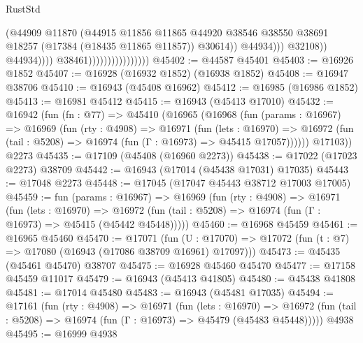 \begin{lexlean}{RustStd}
\begin{coremodule}
                                                      (@44909
                                                        @11870
                                                        (@44915
                                                          @11856
                                                          @11865
                                                          @44920
                                                          @38546
                                                          @38550
                                                          @38691
                                                          @18257
                                                          (@17384 (@18435 @11865 @11857))
                                                          @30614))
                                                      @44934)))
                                                @32108))
                                            @44934))))
                                    @38461))))))))))))))))
@45402 := @44587 @45401
@45403 := @16926 @1852
@45407 := @16928 (@16932 @1852) (@16938 @1852)
@45408 := @16947 @38706
@45410 := @16943 (@45408 @16962)
@45412 := @16985 (@16986 @1852)
@45413 := @16981 @45412
@45415 := @16943 (@45413 @17010)
@45432 := @16942
    (fun (fn : @77) =>
    @45410
      (@16965
        (@16968
          (fun (params : @16967) =>
          @16969
            (fun (rty : @4908) =>
            @16971
              (fun (lets : @16970) =>
              @16972 (fun (tail : @5208) => @16974 (fun (Γ : @16973) => @45415 @17057))))))
        @17103))
    @2273
@45435 := @17109 (@45408 (@16960 @2273))
@45438 := @17022 (@17023 @2273) @38709
@45442 := @16943 (@17014 (@45438 @17031) @17035)
@45443 := @17048 @2273
@45448 := @17045 (@17047 @45443 @38712 @17003 @17005)
@45459 := fun (params : @16967) =>
  @16969
    (fun (rty : @4908) =>
    @16971
      (fun (lets : @16970) =>
      @16972 (fun (tail : @5208) => @16974 (fun (Γ : @16973) => @45415 (@45442 @45448)))))
@45460 := @16968 @45459
@45461 := @16965 @45460
@45470 := @17071
    (fun (U : @17070) => @17072 (fun (t : @7) => @17080 (@16943 (@17086 @38709 @16961) @17097)))
@45473 := @45435 (@45461 @45470) @38707
@45475 := @16928 @45460 @45470
@45477 := @17158 @45459 @11017
@45479 := @16943 (@45413 @41805)
@45480 := @45438 @41808
@45481 := @17014 @45480
@45483 := @16943 (@45481 @17035)
@45494 := @17161
    (fun (rty : @4908) =>
    @16971
      (fun (lets : @16970) =>
      @16972 (fun (tail : @5208) => @16974 (fun (Γ : @16973) => @45479 (@45483 @45448)))))
    @4938
@45495 := @16999 @4938

\end{coremodule}
\end{lexlean}
